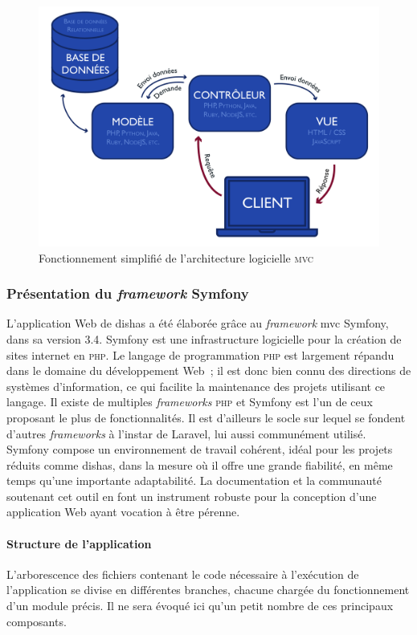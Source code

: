 \documentclass[a4paper,12pt,twoside]{book}
\newcommand{\eng}{\emph}
\newcommand{\php}{\textsc{php}\xspace}
\newcommand{\dishas}{\gls{dishas}\xspace}
\newcommand{\mvc}{\gls{mvc}\xspace}
\begin{document}
\begin{figure}[h!]
	\centering
	\includegraphics[width=14cm]{Images/Architecture-MVC.png}
	\caption{Fonctionnement simplifié de l'architecture logicielle \textsc{mvc}}
\end{figure}

			\subsubsection{Présentation du \emph{framework} Symfony}
L'application Web de \dishas a été élaborée grâce au \eng{framework} \mvc Symfony, dans sa version 3.4. Symfony est une infrastructure logicielle pour la création de sites internet en \php. Le langage de programmation \php est largement répandu dans le domaine du développement Web~; il est donc bien connu des directions de systèmes d'information, ce qui facilite la maintenance des projets utilisant ce langage. Il existe de multiples \eng{frameworks} \php et Symfony est l'un de ceux proposant le plus de fonctionnalités. Il est d'ailleurs le socle sur lequel se fondent d'autres \eng{frameworks} à l'instar de Laravel, lui aussi communément utilisé. Symfony compose un environnement de travail cohérent, idéal pour les projets réduits comme \dishas, dans la mesure où il offre une grande fiabilité, en même temps qu'une importante adaptabilité. La documentation et la communauté soutenant cet outil en font un instrument robuste pour la conception d'une application Web ayant vocation à être pérenne.

				\paragraph{Structure de l'application}
L'arborescence des fichiers contenant le code nécessaire à l'exécution de l'application se divise en différentes branches, chacune chargée du fonctionnement d'un module précis. Il ne sera évoqué ici qu'un petit nombre de ces principaux composants.
\end{document}
